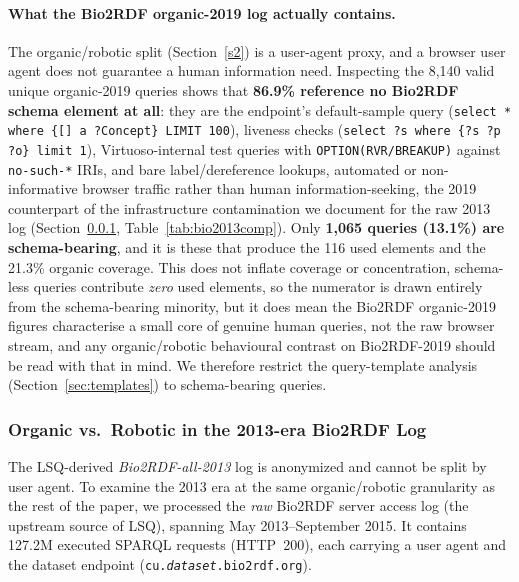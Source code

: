 \documentclass[sw]{iosart2x}
\begin{document}
\paragraph{\textbf{What the Bio2RDF organic-2019 log actually contains.}} The organic/robotic split (Section~\ref{s2}) is a user-agent proxy, and a browser user agent does not guarantee a human information need. Inspecting the 8{,}140 valid unique organic-2019 queries shows that \textbf{86.9\% reference no Bio2RDF schema element at all}: they are the endpoint's default-sample query (\texttt{select * where \{[] a ?Concept\} LIMIT 100}), liveness checks (\texttt{select ?s where \{?s ?p ?o\} limit 1}), Virtuoso-internal test queries with \texttt{OPTION(RVR/BREAKUP)} against \texttt{no-such-*} IRIs, and bare label/dereference lookups, automated or non-informative browser traffic rather than human information-seeking, the 2019 counterpart of the infrastructure contamination we document for the raw 2013 log (Section~\ref{sec:bio2013}, Table~\ref{tab:bio2013comp}). Only \textbf{1{,}065 queries (13.1\%) are schema-bearing}, and it is these that produce the 116 used elements and the 21.3\% organic coverage. This does not inflate coverage or concentration, schema-less queries contribute \emph{zero} used elements, so the numerator is drawn entirely from the schema-bearing minority, but it does mean the Bio2RDF organic-2019 figures characterise a small core of genuine human queries, not the raw browser stream, and any organic/robotic behavioural contrast on Bio2RDF-2019 should be read with that in mind. We therefore restrict the query-template analysis (Section~\ref{sec:templates}) to schema-bearing queries.

\subsubsection{Organic vs.\ Robotic in the 2013-era Bio2RDF Log}\label{sec:bio2013}
The LSQ-derived \emph{Bio2RDF-all-2013} log is anonymized and cannot be split by user agent. To examine the 2013 era at the same organic/robotic granularity as the rest of the paper, we processed the \emph{raw} Bio2RDF server access log (the upstream source of LSQ), spanning May 2013--September 2015. It contains 127.2M executed SPARQL requests (HTTP~200), each carrying a user agent and the dataset endpoint (\texttt{cu.\textit{dataset}.bio2rdf.org}).
\end{document}
